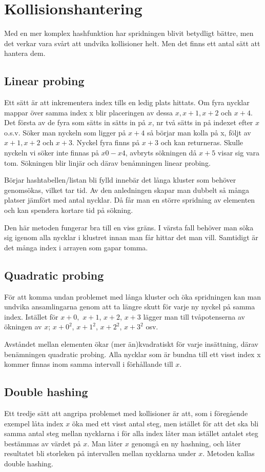 \documentclass[a5paper,10pt,oneside]{article}
\begin{document}
\section*{Kollisionshantering}
Med en mer komplex hashfunktion har spridningen blivit betydligt bättre, men det verkar vara svårt att undvika kollisioner helt. Men det finns ett antal sätt att hantera dem.

\subsection*{Linear probing}
Ett sätt är att inkrementera index tills en ledig plats hittats.
Om fyra nycklar mappar över samma index x blir placeringen av dessa $x, x+1, x+2$ och $x+4$. Det första av de fyra som sätts in sätts in på $x$, nr två sätts in på indexet efter $x$ o.s.v. 
Söker man nyckeln som ligger på $x + 4$ så börjar man kolla på x, följt av $x + 1, x + 2$ och $x+3$. Nyckel fyra finns på $x + 3$ och kan returneras. Skulle nyckeln vi söker inte finnas på $x0 - x4$, avbryts sökningen då $x + 5$ visar sig vara tom. Sökningen blir linjär och därav benåmningen linear probing.

 Börjar hashtabellen/listan bli fylld innebär det långa kluster som behöver genomsökas, vilket tar tid. Av den anledningen skapar man dubbelt så många platser jämfört med antal nycklar. Då får man en större spridning av elementen och kan spendera kortare tid på sökning.

Den här metoden fungerar bra till en viss gräns. I värsta fall behöver man söka sig igenom alla nycklar i klustret innan man får hittar det man vill. Samtidigt är det många index i arrayen som gapar tomma.


\subsection*{Quadratic probing}
För att komma undan problemet med långa kluster och öka spridningen kan man undvika ansamlingarna genom att ta längre skutt för varje ny nyckel på samma index.
Istället för $ x + 0,$  $x + 1$, $x + 2$, $x + 3$ lägger man till tvåpotenserna av ökningen av $x$;
$ x + {0}^{2} $, $ x + {1}^{2} $, $ x + {2}^{2} $, $ x + {3}^{2} $ osv.

Avståndet mellan elementen ökar (mer än)kvadratiskt för varje insättning, därav benämningen quadratic probing. Alla nycklar som är bundna till ett visst index x kommer finnas inom samma intervall i förhållande till $x$.

\subsection*{Double hashing}
Ett tredje sätt att angripa problemet med kollisioner är att, som i föregående exempel låta index $x$ öka med ett visst antal steg, men istället för att det ska bli samma antal steg mellan nycklarna i för alla index låter man istället antalet steg bestämmas av värdet på $x$.
Man låter $x$ genomgå en ny hashning, och låter resultatet bli storleken på intervallen mellan nycklarna under $x$. Metoden kallas double hashing.
\end{document}
